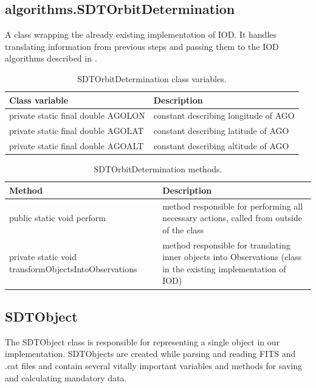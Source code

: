 \newpage

\subsection{algorithms.SDTOrbitDetermination}

	A class wrapping the already existing implementation of IOD. It handles translating information from previous steps and passing them to the IOD algorithms described in .
	
\begin{table}[H]
\centering
\setlength{\extrarowheight}{2pt}
\begin{tabularx}{\textwidth}{|X|X|}
\hline
\textbf{Class variable} & \textbf{Description} \\ \hline
private static final double \mbox{AGOLON} & constant describing longitude of AGO \\ \hline
private static final double \mbox{AGOLAT} & constant describing latitude of AGO\\ \hline
private static final double \mbox{AGOALT} & constant describing altitude of AGO\\ \hline
\end{tabularx}
\caption{SDTOrbitDetermination class variables.}
\label{tab:class_variables_OD}
\end{table}

\begin{table}[H]
\centering
\setlength{\extrarowheight}{2pt}
\begin{tabularx}{\textwidth}{|X|X|}
\hline
\textbf{Method} & \textbf{Description} \\ \hline
public static void \mbox{perform} & method responsible for performing all necessary actions, called from outside of the class \\ \hline
private static void \mbox{transformObjectsIntoObservations} & method responsible for translating inner objects into Observations (class in the existing implementation of IOD)\\ \hline
\end{tabularx}
\caption{SDTOrbitDetermination methods.}
\label{tab:class_methods_OD}
\end{table}

\newpage

\subsection{SDTObject}\label{subsec:object}

	The SDTObject class is responsible for representing a single object in our implementation. SDTObjects are created while parsing and reading FITS and .cat files and contain several vitally important variables and methods for saving and calculating mandatory data.
	
